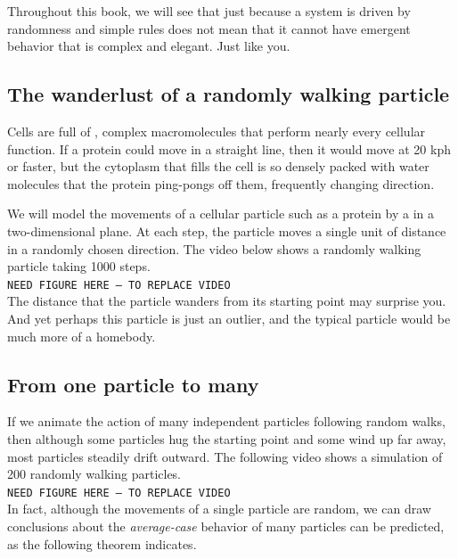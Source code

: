 Throughout this book, we will see that just because a system is driven by randomness and simple rules does not mean that it cannot have emergent behavior that is complex and elegant. Just like you.

\FloatBarrier
{}
\subsection{The wanderlust of a randomly walking particle}

Cells are full of , complex macromolecules that perform nearly every cellular function. If a protein could move in a straight line, then it would move at 20 kph or faster, but the cytoplasm that fills the cell is so densely packed with water molecules that the protein ping-pongs off them, frequently changing direction.

We will model the movements of a cellular particle such as a protein by a  in a two-dimensional plane. At each step, the particle moves a single unit of distance in a randomly chosen direction. The video below shows a randomly walking particle taking 1000 steps.\\

\texttt{NEED FIGURE HERE -- TO REPLACE VIDEO}\\

The distance that the particle wanders from its starting point may surprise you. And yet perhaps this particle is just an outlier, and the typical particle would be much more of a homebody.

\FloatBarrier
{}
\subsection{From one particle to many}

If we animate the action of many independent particles following random walks, then although some particles hug the starting point and some wind up far away, most particles steadily drift outward. The following video shows a simulation of 200 randomly walking particles.\\

\texttt{NEED FIGURE HERE -- TO REPLACE VIDEO}\\

In fact, although the movements of a single particle are random, we can draw conclusions about the \textit{average-case} behavior of many particles can be predicted, as the following theorem indicates.

